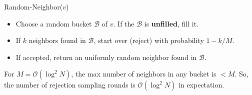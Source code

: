 \begin{alertblock}{Random-Neighbor($v$)}
\begin{itemize}
    \item Choose a random bucket $\mathcal B$ of $v$. If the $\mathcal B$ is \textbf{unfilled}, fill it.
    \item If $k$ neighbors found in $\mathcal B$, start over (reject) with probability $1-k/M$.
    \item If accepted, return an uniformly random neighbor found in $\mathcal B$.
\end{itemize}
For $M = \mathcal O(\log^2 N)$, the max number of neighbors in any bucket is $<M$.
So, the number of rejection sampling rounds is $\mathcal O(\log^2 N)$ in expectation.
\end{alertblock}






